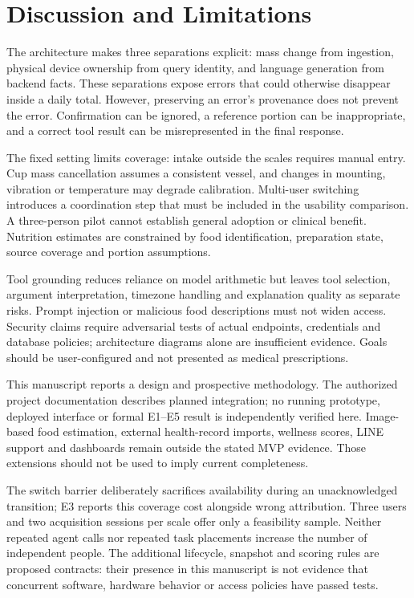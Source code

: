 \section{Discussion and Limitations}\label{sec:discussion}
The architecture makes three separations explicit: mass change from ingestion, physical device ownership from query identity, and language generation from backend facts. These separations expose errors that could otherwise disappear inside a daily total. However, preserving an error's provenance does not prevent the error. Confirmation can be ignored, a reference portion can be inappropriate, and a correct tool result can be misrepresented in the final response.

The fixed setting limits coverage: intake outside the scales requires manual entry. Cup mass cancellation assumes a consistent vessel, and changes in mounting, vibration or temperature may degrade calibration. Multi-user switching introduces a coordination step that must be included in the usability comparison. A three-person pilot cannot establish general adoption or clinical benefit. Nutrition estimates are constrained by food identification, preparation state, source coverage and portion assumptions.

Tool grounding reduces reliance on model arithmetic but leaves tool selection, argument interpretation, timezone handling and explanation quality as separate risks. Prompt injection or malicious food descriptions must not widen access. Security claims require adversarial tests of actual endpoints, credentials and database policies; architecture diagrams alone are insufficient evidence. Goals should be user-configured and not presented as medical prescriptions.

This manuscript reports a design and prospective methodology. The authorized project documentation describes planned integration; no running prototype, deployed interface or formal E1--E5 result is independently verified here. Image-based food estimation, external health-record imports, wellness scores, LINE support and dashboards remain outside the stated MVP evidence. Those extensions should not be used to imply current completeness.

The switch barrier deliberately sacrifices availability during an unacknowledged transition; E3 reports this coverage cost alongside wrong attribution. Three users and two acquisition sessions per scale offer only a feasibility sample. Neither repeated agent calls nor repeated task placements increase the number of independent people. The additional lifecycle, snapshot and scoring rules are proposed contracts: their presence in this manuscript is not evidence that concurrent software, hardware behavior or access policies have passed tests.

